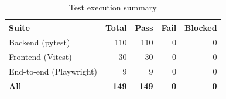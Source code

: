 \begin{table}[H]\centering\small\caption{Test execution summary}\label{tab:testsummary}
\begin{tabular}{|l|r|r|r|r|}\hline \textbf{Suite} & \textbf{Total} & \textbf{Pass} & \textbf{Fail} & \textbf{Blocked}\\ \hline
Backend (pytest) & 110 & 110 & 0 & 0\\ \hline
Frontend (Vitest) & 30 & 30 & 0 & 0\\ \hline
End-to-end (Playwright) & 9 & 9 & 0 & 0\\ \hline
\textbf{All} & \textbf{149} & \textbf{149} & \textbf{0} & \textbf{0}\\ \hline
\end{tabular}\end{table}
